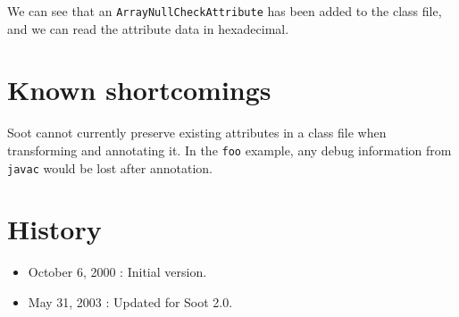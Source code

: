 \documentclass{article}
\begin{document}
We can see that an {\tt ArrayNullCheckAttribute} has been added to
the class file, and we can read the attribute data in hexadecimal.

\section*{Known shortcomings}
Soot cannot currently preserve existing attributes in a class file
when transforming and annotating it.  In the {\tt foo} example,
any debug information from {\tt javac} would be lost after annotation.

\section*{History}
\begin{itemize}
\item October 6, 2000 : Initial version.
\item May 31, 2003 : Updated for Soot 2.0.
\end{itemize}
\end{document}
